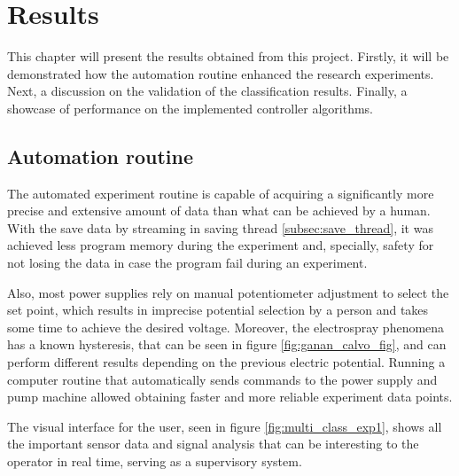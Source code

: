 \chapter{Results}
\label{chap:Results}

This chapter will present the results obtained from this project. 
Firstly, it will be demonstrated how the automation routine enhanced the research experiments. 
Next, a discussion on the validation of the classification results. 
Finally, a showcase of performance on the implemented controller algorithms.

\section{Automation routine}
\label{sec:automation_routine}

The automated experiment routine is capable of acquiring a significantly more precise and extensive amount of data than what can be achieved by a human. 
With the save data by streaming in saving thread \ref{subsec:save_thread}, it was achieved less program memory during the experiment and, specially, safety for not losing the data in case the program fail during an experiment.

Also, most power supplies rely on manual potentiometer adjustment to select the set point, which results in imprecise potential selection by a person and takes some time to achieve the desired voltage.
Moreover, the electrospray phenomena has a known hysteresis, that can be seen in figure \ref{fig:ganan_calvo_fig}, and can perform different results depending on the previous electric potential.
Running a computer routine that automatically sends commands to the power supply and pump machine allowed obtaining faster and more reliable experiment data points.

The visual interface for the user, seen in figure \ref{fig:multi_class_exp1}, shows all the important sensor data and signal analysis that can be interesting to the operator in real time, serving as a supervisory system.

